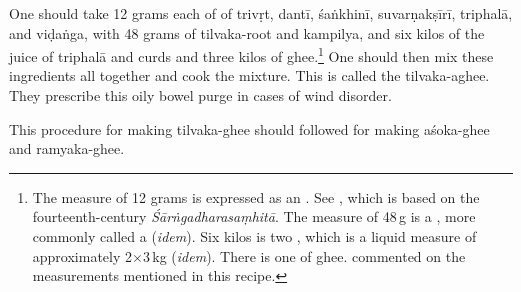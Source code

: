 \begin{translation}
One should take 12 grams each of  of \gls{trivṛt},
\gls{dantī}, \gls{śaṅkhinī}, \gls{suvarṇakṣīrī}, \gls{triphalā}, and
\gls{viḍaṅga}, with 48 grams of \gls{tilvaka}-root and \gls{kampilya},
and six kilos of the juice of \gls{triphalā} and curds and three kilos
of ghee.\footnote{The measure of 12 grams is expressed as an
    .  See \cite[263]{wuja-2003}, which is based on the
    fourteenth-century \emph{Śārṅgadharasaṃhitā}.  The measure of 48\,g is
    a , more commonly called a  (\emph{idem}).  Six
    kilos is two , which is a liquid measure of approximately 
    2$\times$3\,kg (\emph{idem}).  There is one  of ghee.
                commented on the measurements mentioned in this recipe.} One 
                should
                then mix these ingredients all together and cook the mixture. This is
                called the \gls{tilvaka}-aghee. They prescribe this oily bowel purge in
                cases of wind disorder.
                
                 This procedure for making \gls{tilvaka}-ghee
                    should followed for making \gls{aśoka}-ghee and
                    \gls{ramyaka}-ghee.


\end{translation}
